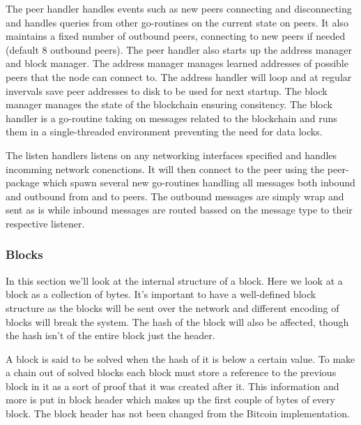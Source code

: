 \documentclass[12pt]{article}
\begin{document}
The peer handler handles events such as new peers connecting and disconnecting and handles queries from other go-routines on the current state on peers. It also maintains a fixed number of outbound peers, connecting to new peers if needed (default 8 outbound peers). The peer handler also starts up the address manager and block manager. The address manager manages learned addresses of possible peers that the node can connect to. The address handler will loop and at regular invervals save peer addresses to disk to be used for next startup. The block manager manages the state of the blockchain ensuring consitency. The block handler is a go-routine taking on messages related to the blockchain and runs them in a single-threaded environment preventing the need for data locks.

The listen handlers listens on any networking interfaces specified and handles incomming network conenctions. It will then connect to the peer using the peer-package which spawn several new go-routines handling all messages both inbound and outbound from and to peers. The outbound messages are simply wrap and sent as is while inbound messages are routed bassed on the message type to their respective listener.

\subsubsection{Blocks}
In this section we'll look at the internal structure of a block. Here we look at a block as a collection of bytes. It's important to have a well-defined block structure as the blocks will be sent over the network and different encoding of blocks will break the system. The hash of the block will also be affected, though the hash isn't of the entire block just the header.

A block is said to be solved when the hash of it is below a certain value. To make a chain out of solved blocks each block must store a reference to the previous block in it as a sort of proof that it was created after it. This information and more is put in block header which makes up the first couple of bytes of every block. The block header has not been changed from the Bitcoin implementation. 
\end{document}
